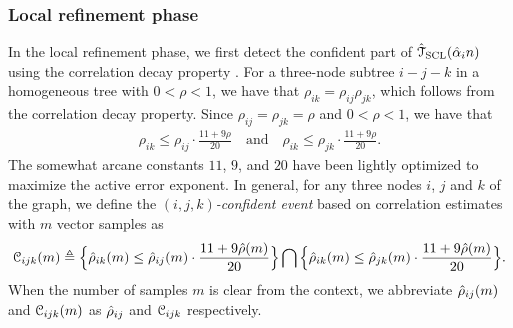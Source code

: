 \subsubsection{Local refinement phase}
In the local refinement phase,  we first detect the confident part of $\hat{\mathcal{T}}_{\rm{SCL}}(\hat{\alpha}_{i}n)$ using the correlation decay property \cite{nikolakakis2021predictive}.  
For a three-node subtree $i-j-k$ in a homogeneous tree with $0<\rho<1$, we have that $\rho_{ik}=\rho_{ij}\rho_{jk}$, which follows from the correlation decay property. Since $\rho_{ij}=\rho_{jk}=\rho$ and $0<\rho<1$, we have that
\begin{align}
	\rho_{ik}\leq \rho_{ij}\cdot\frac{11+9\rho}{20}  \quad\mbox{and}\quad \rho_{ik}\leq \rho_{jk}\cdot\frac{ 11+9\rho}{20}.
\end{align}
The somewhat arcane constants $11$, $9$, and $20$ have been lightly optimized to maximize the active error exponent. In general, for any three nodes $i$, $j$ and $k$ of the graph, we define the \emph{$(i,j,k)$-confident event} 
based on correlation estimates with $m$ vector samples as
\begin{align}\label{eq:confevent}
	\mathcal{C}_{ijk}(m)\triangleq\Big\{\hat{\rho}_{ik}(m)\leq \hat{\rho}_{ij}(m)\cdot\frac{11+9\hat{\rho}(m)}{20}\Big\}\bigcap\Big\{\hat{\rho}_{ik}(m)\leq \hat{\rho}_{jk}(m)\cdot\frac{11+9\hat{\rho}(m)}{20}\Big\}.
\end{align}
When the number of samples $m$ is clear from the context, we abbreviate   $\hat{\rho}_{ij}(m)$ and $\mathcal{C}_{ijk}(m)$ as $\hat{\rho}_{ij}$ and $\mathcal{C}_{ijk}$ respectively.

